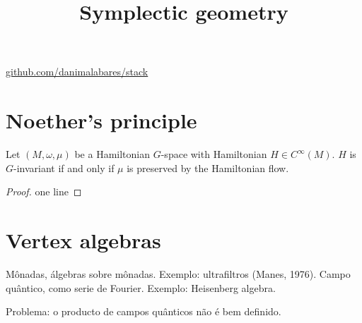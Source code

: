 



\title{Symplectic geometry}
\maketitle

\label{section-phantom}
\hfill
\href{http://github.com/danimalabares/stack}{github.com/danimalabares/stack}

\tableofcontents

\section{Noether's principle}
\label{section-Noether-principle}

\begin{theorem}
\label{theorem-Noether-principle}
Let $(M,\omega,\mu)$ be a Hamiltonian $G$-space with Hamiltonian
$H\in C^\infty(M)$. $H$ is $G$-invariant if and only if $\mu$ is preserved by
the Hamiltonian flow.
\end{theorem}

\begin{proof}
one line
\end{proof}

\section{Vertex algebras}
\label{section-vertex-algebras}

Mônadas, álgebras sobre mônadas. Exemplo: ultrafiltros (Manes, 1976). Campo
quântico, como serie de Fourier. Exemplo: Heisenberg algebra.

Problema: o producto de campos quânticos não é bem definido.






